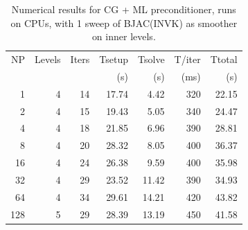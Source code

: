 \iffalse
\begin{table}[h!]
\centering
\caption{Numerical results for CG + ML preconditioner, runs on CPUs, with 1 sweep of BJAC(INVK) as smoother on inner levels.}
\label{cpu-invk}

\begin{tabular}{rrrrrrr}
NP  & Levels & Iters & Tsetup & Tsolve & T/iter & Ttotal \\
    &        &       & (s)    & (s)    & (ms)   & (s)    \\
\hline
1   & 4       & 14  & 17.74 & 4.42  & 320      & 22.15   \\
2   & 4       & 15  & 19.43 & 5.05  & 340      & 24.47   \\
4   & 4       & 18  & 21.85 & 6.96  & 390      & 28.81   \\
8   & 4       & 20  & 28.32 & 8.05  & 400      & 36.37   \\
16  & 4       & 24  & 26.38 & 9.59  & 400      & 35.98   \\
32  & 4       & 29  & 23.52 & 11.42 & 390      & 34.93   \\
64  & 4       & 34  & 29.61 & 14.21 & 420      & 43.82   \\
128 & 5       & 29  & 28.39 & 13.19 & 450      & 41.58    \\
\hline
\end{tabular}
\end{table}

